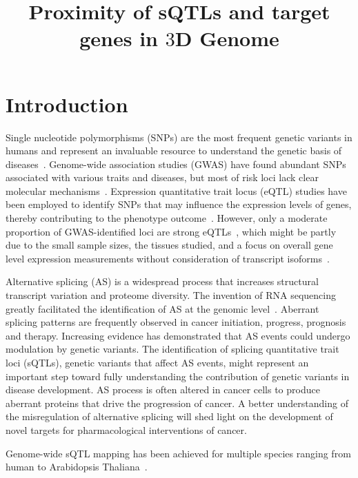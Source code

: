 \documentclass[11pt]{article}
\title{\vspace{-4cm} Proximity of sQTLs and target genes in $3$D Genome}
\author{} %
\date{}
\begin{document}
\maketitle

\section{Introduction}

 Single nucleotide polymorphisms (SNPs) are the most frequent genetic
 variants in humans and represent an invaluable resource to understand
 the genetic basis of diseases~\cite{shastry2009}. Genome-wide
 association studies (GWAS) have found abundant SNPs associated with
 various traits and diseases, but most of risk loci lack clear
 molecular mechanisms~\cite{chang2018}. Expression quantitative trait
 locus (eQTL) studies have been employed to identify SNPs that may influence
 the expression levels of genes, thereby contributing to the phenotype
 outcome~\cite{guo2017,danyi2018,gong2017}. However, only a moderate proportion of GWAS-identified
 loci are strong eQTLs~\cite{}, which might be partly due to the small
 sample sizes, the tissues studied, and a focus on overall gene level
 expression measurements without consideration of transcript isoforms~\cite{}.

Alternative splicing (AS) is a widespread process that increases
structural transcript variation and proteome diversity. The invention of RNA sequencing greatly facilitated
the identification of AS at the genomic level~\cite{hyung2017}. Aberrant splicing patterns are frequently observed in cancer initiation,
progress, prognosis and therapy. Increasing evidence has demonstrated
that AS events could undergo modulation by genetic variants. The
identification of splicing quantitative trait loci (sQTLs), genetic
variants that affect AS events, might represent an important step
toward fully understanding the contribution of genetic variants in
disease development. AS process is often altered in cancer cells to
produce aberrant proteins that drive the progression of cancer. A
better understanding of the misregulation of alternative splicing will
shed light on the development of novel targets for pharmacological
interventions of cancer.

Genome-wide sQTL mapping has been achieved for multiple species
ranging from human to Arabidopsis Thaliana~\cite{khokhar2019}.

\end{document}

